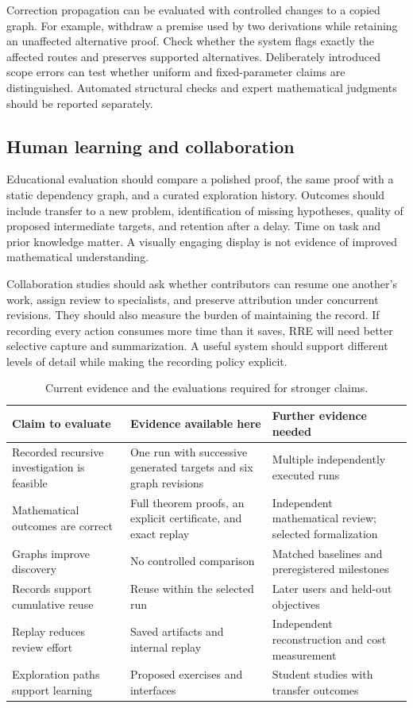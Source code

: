 Correction propagation can be evaluated with controlled changes to a copied graph. For example, withdraw a premise used by two derivations while retaining an unaffected alternative proof. Check whether the system flags exactly the affected routes and preserves supported alternatives. Deliberately introduced scope errors can test whether uniform and fixed-parameter claims are distinguished. Automated structural checks and expert mathematical judgments should be reported separately.

\subsection{Human learning and collaboration}

Educational evaluation should compare a polished proof, the same proof with a static dependency graph, and a curated exploration history. Outcomes should include transfer to a new problem, identification of missing hypotheses, quality of proposed intermediate targets, and retention after a delay. Time on task and prior knowledge matter. A visually engaging display is not evidence of improved mathematical understanding.

Collaboration studies should ask whether contributors can resume one another's work, assign review to specialists, and preserve attribution under concurrent revisions. They should also measure the burden of maintaining the record. If recording every action consumes more time than it saves, RRE will need better selective capture and summarization. A useful system should support different levels of detail while making the recording policy explicit.

\begin{table}[htbp]
\centering\small
\begin{tabularx}{\linewidth}{@{}p{3cm}YY@{}}
\toprule
Claim to evaluate & Evidence available here & Further evidence needed \\
\midrule
Recorded recursive investigation is feasible & One run with successive generated targets and six graph revisions & Multiple independently executed runs \\
Mathematical outcomes are correct & Full theorem proofs, an explicit certificate, and exact replay & Independent mathematical review; selected formalization \\
Graphs improve discovery & No controlled comparison & Matched baselines and preregistered milestones \\
Records support cumulative reuse & Reuse within the selected run & Later users and held-out objectives \\
Replay reduces review effort & Saved artifacts and internal replay & Independent reconstruction and cost measurement \\
Exploration paths support learning & Proposed exercises and interfaces & Student studies with transfer outcomes \\
\bottomrule
\end{tabularx}
\caption{Current evidence and the evaluations required for stronger claims.}
\end{table}
